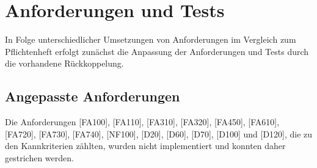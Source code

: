 \documentclass[parskip=full]{scrartcl}
\begin{document}
\section{Anforderungen und Tests}
In Folge unterschiedlicher Umsetzungen von Anforderungen im Vergleich zum Pflichtenheft erfolgt zunächst die Anpassung der Anforderungen und Tests durch die vorhandene Rückkoppelung.

\subsection{Angepasste Anforderungen}
Die Anforderungen [FA100], [FA110], [FA310], [FA320], [FA450], [FA610], [FA720], [FA730], [FA740], [NF100], [D20], [D60], [D70], [D100] und [D120], die zu den Kannkriterien zählten, wurden nicht implementiert und konnten daher gestrichen werden.
\end{document}
